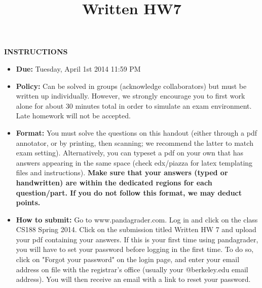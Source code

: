 \usepackage{class}
\usepackage{fancyhdr}
\usepackage{booktabs}
\usepackage{setspace}
\usepackage{amsmath,mathrsfs}
\usepackage{multicol}
\usepackage{amssymb}
\usepackage{tikz}
\usetikzlibrary{matrix}
\usepackage{graphicx}
\usepackage{subfig}
\usepackage{array}
\usepackage{xcolor}
\usepackage{float}
\usepackage{enumitem}
\usepackage{mathcomp}
\usepackage{tabularx}
\usepackage{wasysym}
\usepackage{pbox}
\usetikzlibrary{bayesnet}

\newcommand{\mcqbubble}{\bigcirc}
\newcommand{\mcqbubblefill}{\Large\newmoon}

\newcommand{\mcqb}{$\bigcirc$\ \ }
\newcommand{\mcqs}{\solution{\mcqb}{$\Large\newmoon$\ \ }}

\newcommand{\prune}{\texttt{[image: figures/red\_x]}}
\title{Written HW7}

\thispagestyle{empty}
\maketitle


\smallskip
\smallskip
\textbf{INSTRUCTIONS}

\begin{itemize}
\item \textbf{Due:} Tuesday, April 1st 2014 11:59 PM
\item \textbf{Policy:} Can be solved in groups (acknowledge collaborators) but must
be written up individually. However,
we strongly encourage you to first work alone for about 30 minutes total in order to simulate an exam environment.  Late homework
will not be accepted.
\item \textbf{Format:}
You must solve the questions on this handout (either through a pdf annotator, or by printing, then scanning; we recommend the latter to match exam setting). Alternatively, you can typeset a pdf on your own that has answers appearing in the same space (check edx/piazza for latex templating files and instructions).
\textbf{Make sure that your answers (typed or handwritten) are within the
dedicated regions for each question/part.  If you do not follow this format, we may deduct points.}

\item \textbf{How to submit:}  Go to www.pandagrader.com. Log in and click on the
class CS188 Spring 2014. Click
on the submission titled Written HW 7 and upload your pdf containing your answers. If this is your first time using
pandagrader, you will have to set your password before logging in the
first time.  To do so, click on "Forgot your password" on the login
page, and enter your email address on file with the registrar's office
(usually your @berkeley.edu email address). You will then receive an
email with a link to reset your password.

\end{itemize}


